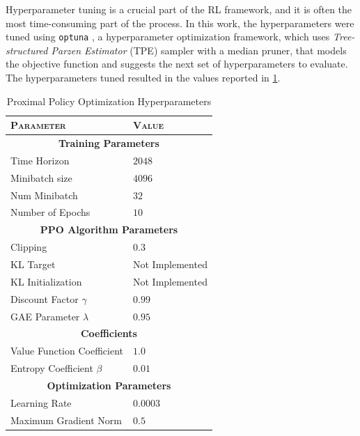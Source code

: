 Hyperparameter tuning is a crucial part of the \ac{RL} framework, and it is often the most time-consuming part of the process. In this work, the hyperparameters were tuned using \texttt{optuna} \citep{akiba_optuna_2019}, a hyperparameter optimization framework, which uses \textit{Tree-structured Parzen Estimator} (\ac{TPE}) sampler with a median pruner, that models the objective function and suggests the next set of hyperparameters to evaluate. The hyperparameters tuned resulted in the values reported in \cref{tab:ppohyperparameters}.


\begin{table}[h]
    \centering
    \begin{tabular}{ll}
        \toprule
        \textsc{Parameter}          & \textsc{Value}          \\
        \midrule
        \multicolumn{2}{c}{\textbf{Training Parameters}}      \\
        Time Horizon                & $2048$                  \\
        Minibatch size              & $4096$                  \\
        Num Minibatch               & $32$                    \\
        Number of Epochs            & $10$                    \\
        \midrule
        \multicolumn{2}{c}{\textbf{PPO Algorithm Parameters}} \\
        Clipping                    & $0.3$                   \\
        KL Target                   & Not Implemented         \\
        KL Initialization           & Not Implemented         \\
        Discount Factor $\gamma$    & $0.99$                  \\
        GAE Parameter $\lambda$     & $0.95$                  \\
        \midrule
        \multicolumn{2}{c}{\textbf{Coefficients}}             \\
        Value Function Coefficient  & $1.0$                   \\
        Entropy Coefficient $\beta$ & $0.01$                  \\
        \midrule
        \multicolumn{2}{c}{\textbf{Optimization Parameters}}  \\
        Learning Rate               & $0.0003$                \\
        Maximum Gradient Norm       & $0.5$                   \\
        \bottomrule
    \end{tabular}
    \caption{Proximal Policy Optimization Hyperparameters}
    \label{tab:ppohyperparameters}
\end{table}

